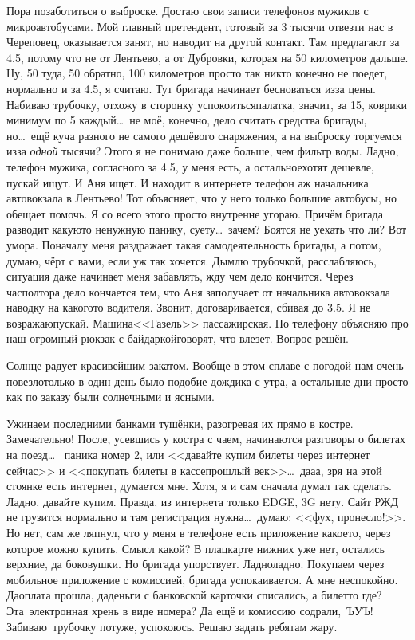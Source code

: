 Пора позаботиться о выброске. Достаю свои записи телефонов мужиков с микроавтобусами. Мой главный претендент, готовый за 3 тысячи отвезти нас в Череповец, оказывается занят, но наводит на другой контакт. Там предлагают за 4.5, потому что не от Лентьево, а от Дубровки, которая на 50 километров дальше. Ну, 50 туда, 50 обратно, 100 километров просто так никто конечно не поедет, нормально и за 4.5, я считаю. Тут бригада начинает бесноваться из\sdash за цены. Набиваю трубочку, отхожу в сторонку успокоиться\mdash палатка, значит, за 15, коврики минимум по 5 каждый\ldots~не моё, конечно, дело считать средства бригады, но\ldots~ещё куча разного не самого дешёвого снаряжения, а на выброску торгуемся из\sdash за \textit{одной} тысячи? Этого я не понимаю даже больше, чем фильтр воды. Ладно, телефон  мужика, согласного за 4.5, у  меня есть, а остальное\mdash хотят дешевле, пускай ищут. И Аня ищет. И находит в интернете телефон аж начальника автовокзала в Лентьево! Тот объясняет, что у него только большие автобусы, но обещает помочь. Я со всего этого просто внутренне угораю. Причём бригада разводит какую\sdash то ненужную панику, суету\ldots~зачем? Боятся не уехать что ли? Вот умора.
\newpage
Поначалу меня раздражает такая самодеятельность бригады, а потом, думаю, чёрт с вами, если уж так хочется. Дымлю трубочкой, расслабляюсь, ситуация даже начинает меня забавлять, жду чем дело кончится. Через час\sdash полтора дело кончается тем, что Аня заполучает от начальника автовокзала наводку на какого\sdash то водителя. Звонит, договаривается, сбивая до 3.5. Я не возражаю\mdash пускай. Машина\mdash <<Газель>> пассажирская. По телефону объясняю про наш огромный рюкзак с байдаркой\mdash говорят, что влезет. Вопрос решён.

Солнце радует красивейшим закатом. Вообще в этом сплаве с погодой нам очень повезло\mdash только в один день было подобие дождика с утра, а остальные дни просто как по заказу были солнечными и ясными.

Ужинаем последними банками тушёнки, разогревая их прямо в костре. Замечательно! После, усевшись у костра с чаем, начинаются разговоры о билетах на поезд\ldots~ паника номер 2, или <<давайте купим билеты через интернет сейчас>> и <<покупать билеты в кассе\mdash прошлый век>>\ldots~да\sdash а\sdash а, зря на этой стоянке есть интернет, думается мне. Хотя, я и сам сначала думал так сделать. Ладно, давайте купим. Правда, из интернета только EDGE, 3G нету. Сайт РЖД не грузится нормально и там регистрация нужна\ldots~думаю: <<фух, пронесло!>>. Но нет, сам же ляпнул, что у меня в телефоне есть приложение какое\sdash то, через которое можно купить. Смысл какой? В плацкарте нижних уже нет, остались верхние, да боковушки. Но бригада упорствует. Ладно\sdash ладно. Покупаем через мобильное приложение с комиссией, бригада успокаивается. А мне неспокойно. Да\mdash оплата прошла, да\mdash деньги с банковской карточки списались, а билет\sdash то где? Эта~электронная хрень в виде номера? Да ещё и комиссию содрали,~ЪУЪ! Забиваю~трубочку потуже, успокоюсь. Решаю задать ребятам жару.

